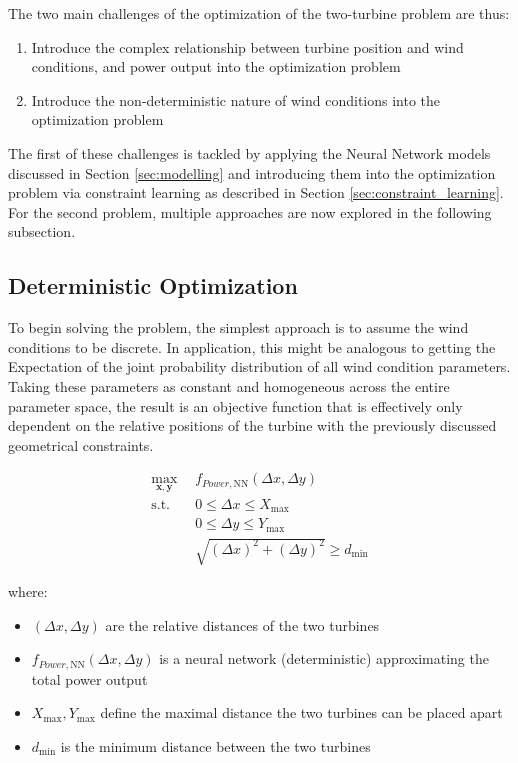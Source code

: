 The two main challenges of the optimization of the two-turbine problem are thus: 

\begin{enumerate}
	\item Introduce the complex relationship between turbine position and wind conditions, and power output into the optimization problem
	\item Introduce the non-deterministic nature of wind conditions into the optimization problem
\end{enumerate}

The first of these challenges is tackled by applying the Neural Network models discussed in Section \ref{sec:modelling} and introducing them into the optimization problem via constraint learning as described in Section \ref{sec:constraint_learning}. For the second problem, multiple approaches are now explored in the following subsection.


\subsection{Deterministic Optimization}

To begin solving the problem, the simplest approach is to assume the wind conditions to be discrete. In application, this might be analogous to getting the Expectation of the joint probability distribution of all wind condition parameters. Taking these parameters as constant and homogeneous across the entire parameter space, the result is an objective function that is effectively only dependent on the relative positions of the turbine with the previously discussed geometrical constraints.

\begin{align}
	\max_{\mathbf{x}, \mathbf{y}} & f_{Power,\text{NN}}(\Delta x, \Delta y) \\
	\text{s.t.} \quad 
	&  0 \leq \Delta x \leq X_{\max} \\
	&  0 \leq \Delta y \leq Y_{\max} \\
	& \sqrt{(\Delta x)^2 + (\Delta y)^2} \geq d_{\min}
\end{align}

where:
\begin{itemize}
	\item \( (\Delta x, \Delta y) \) are the relative distances of the two turbines
	\item \( f_{Power, \text{NN}}(\Delta x, \Delta y)\) is a neural network (deterministic) approximating the total power output
	\item \(  X_{\max}, Y_{\max} \) define the maximal distance the two turbines can be placed apart
	\item \( d_{\min} \) is the minimum distance between the two turbines
\end{itemize}


